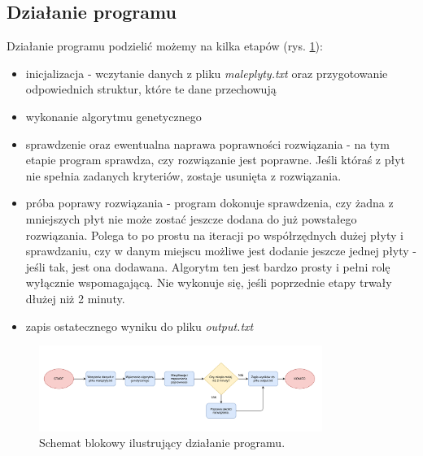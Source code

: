 \documentclass[11pt,a4paper,oneside]{article}
\begin{document}
\subsection{Działanie programu}
Działanie programu podzielić możemy na kilka etapów (rys. \ref{fig:fig1}):
\begin{itemize}[noitemsep, topsep=0pt]
\item inicjalizacja - wczytanie danych z pliku \textit{maleplyty.txt} oraz przygotowanie odpowiednich struktur, które te dane przechowują
\item wykonanie algorytmu genetycznego
\item sprawdzenie oraz ewentualna naprawa poprawności rozwiązania - na tym etapie program sprawdza, czy rozwiązanie jest poprawne. Jeśli któraś z płyt nie spełnia zadanych kryteriów, zostaje usunięta z rozwiązania.
\item próba poprawy rozwiązania - program dokonuje sprawdzenia, czy żadna z mniejszych płyt nie może zostać jeszcze dodana do już powstałego rozwiązania. Polega to po prostu na iteracji po współrzędnych dużej płyty i sprawdzaniu, czy w danym miejscu możliwe jest dodanie jeszcze jednej płyty - jeśli tak, jest ona dodawana. Algorytm ten jest bardzo prosty i pełni rolę wyłącznie wspomagającą. Nie wykonuje się, jeśli poprzednie etapy trwały dłużej niż 2 minuty.
\item zapis ostatecznego wyniku do pliku \textit{output.txt}
\end{itemize}

\begin{figure}[H]
\centering
\includegraphics[width=0.82\textwidth]{res/Diagram.pdf}
\caption{Schemat blokowy ilustrujący działanie programu.}
\label{fig:fig1}
\end{figure}

\clearpage
\end{document}
